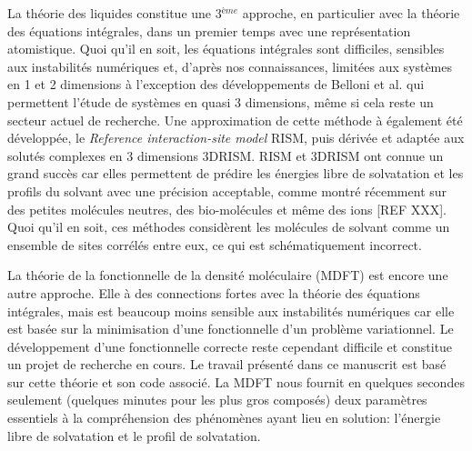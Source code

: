La théorie des liquides constitue une 3$^{ème}$ approche, en particulier avec la théorie des équations intégrales, dans un premier temps avec une représentation atomistique. Quoi qu'il en soit, les équations intégrales sont difficiles, sensibles aux instabilités numériques et, d'après nos connaissances, limitées aux systèmes en 1 et 2 dimensions à l'exception des développements de Belloni et al. qui permettent l'étude de systèmes en quasi 3 dimensions, même si cela reste un secteur actuel de recherche. Une approximation de cette méthode à également été développée, le \textit{Reference interaction-site model} RISM, puis dérivée et adaptée aux solutés complexes en 3 dimensions 3DRISM. RISM et 3DRISM ont connue un grand succès car elles permettent de prédire les énergies libre de solvatation et les profils du solvant avec une précision acceptable, comme montré récemment sur des petites molécules neutres, des bio-molécules et même des ions [REF XXX]. Quoi qu'il en soit, ces méthodes considèrent les molécules de solvant comme un ensemble de sites corrélés entre eux, ce qui est schématiquement incorrect.

La théorie de la fonctionnelle de la densité moléculaire (MDFT) est encore une autre approche. Elle à des connections fortes avec la théorie des équations intégrales, mais est beaucoup moins sensible aux instabilités numériques car elle est basée sur la minimisation d'une fonctionnelle d'un problème variationnel. Le développement d'une fonctionnelle correcte reste cependant difficile et constitue un projet de recherche en cours. Le travail présenté dans ce manuscrit est basé sur cette théorie et son code associé. La MDFT nous fournit en quelques secondes seulement (quelques minutes pour les plus gros composés) deux paramètres essentiels à la compréhension des phénomènes ayant lieu en solution: l'énergie libre de solvatation et le profil de solvatation.



